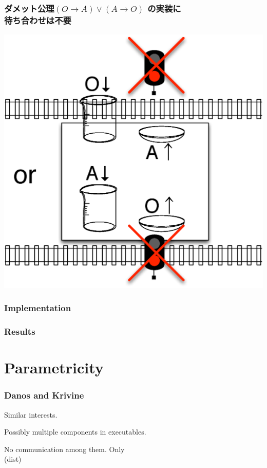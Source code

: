 \documentclass[slidestop,compress,mathserif]{beamer}
\begin{document}
\begin{frame}
 \end{frame}

 \begin{frame}
  \frametitle{ダメット公理$(O\rightarrow  A)\lor (A\rightarrow O)$
  の実装に\\待ち合わせは不要}

  \includegraphics[height=0.8\textheight]{d.eps}
 \end{frame}

  \begin{frame}
   \frametitle{Implementation}
  \end{frame}

  \begin{frame}
   \frametitle{Results}
  \end{frame}

  \section{Parametricity}

  \begin{frame}
   \frametitle{Danos and Krivine}

   Similar interests.

   Possibly multiple components in executables.

   No communication among them.  Only\\
   (dist)
  \end{frame}
\end{document}
